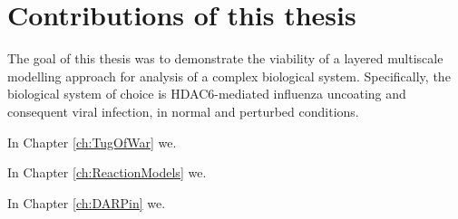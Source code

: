 \section{Contributions of this thesis}

The goal of this thesis was to demonstrate the viability of a layered multiscale modelling approach for analysis of a complex biological system. Specifically, the biological system of choice is HDAC6-mediated influenza uncoating and consequent viral infection, in normal and perturbed conditions.

In Chapter \ref{ch:TugOfWar} we.

In Chapter \ref{ch:ReactionModels} we.

In Chapter \ref{ch:DARPin} we.